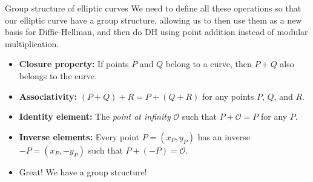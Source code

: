 \documentclass[aspectratio=169, lualatex, handout]{beamer}
\begin{document}
\begin{frame}{Group structure of elliptic curves}
	We need to define all these operations so that our elliptic curve have a group structure, allowing us to then use them as a new basis for Diffie-Hellman, and then do DH using point addition instead of modular multiplication.
	\begin{itemize}
		\item \textbf{Closure property:} If points $P$ and $Q$ belong to a curve, then $P + Q$ also belongs to the curve.
		\item \textbf{Associativity:} $(P + Q) + R = P + (Q + R)$ for any points $P$, $Q$, and $R$.
		\item \textbf{Identity element:} The \emph{point at infinity} $\mathcal{O}$ such that $P + \mathcal{O} = P$ for any $P$.
		\item \textbf{Inverse elements:} Every point $P = (x_P, y_P)$ has an inverse $-P = (x_P, -y_P)$ such that $P + (-P) = \mathcal{O}$.
		\item Great! We have a group structure!
	\end{itemize}
\end{frame}
\end{document}

